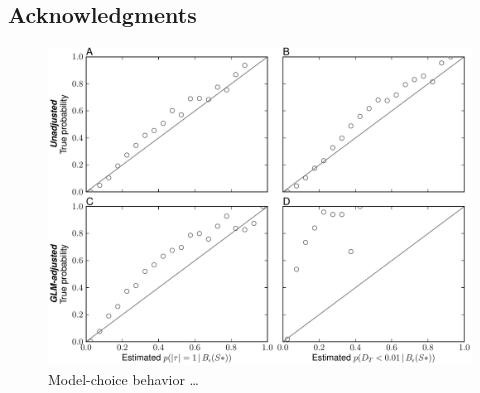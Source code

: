 \documentclass[letterpaper,12pt]{article}
\begin{document}
\begin{linenumbers}
\section*{Acknowledgments}



\newpage
\singlespacing

\renewcommand\listfigurename{Figure Captions}
\renewcommand\cftdotsep{\cftnodots}
\setlength\cftbeforefigskip{10pt}
\listoffigures


\end{linenumbers}

\newpage
\singlespacing


\clearpage

\newpage

\begin{figure}[hbtp]
    \captionsetup{listformat=figList}
    \centering
    \includegraphics[width=1.0\textwidth]{../../validation/results/dpp/pymsbayes-results/plots/prior-dpp_prior-dpp_mc_behavior.pdf}
    \caption{
        Model-choice behavior \ldots
    }
    \label{fig_dpp_dpp_val_mc}
\end{figure}

\clearpage


\setcounter{figure}{0}
\setcounter{table}{0}
\setcounter{page}{1}

\singlespacing

\renewcommand{\refname}{\noindent\MakeUppercase{\LARGE\sffamily\upshape supporting information}}





\end{document}

